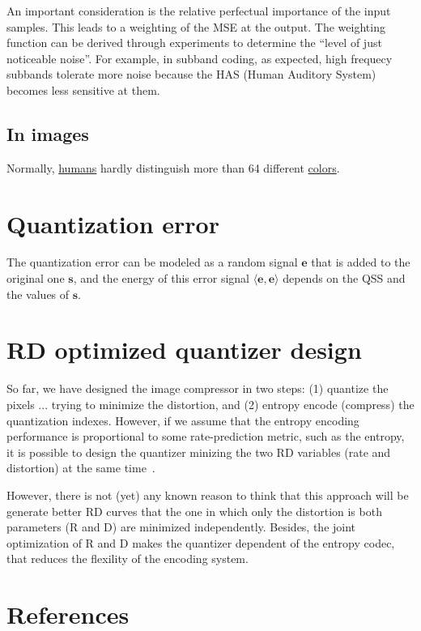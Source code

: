 An important consideration is the relative perfectual importance of
the input samples. This leads to a weighting of the MSE at the
output. The weighting function can be derived through experiments to
determine the ``level of just noticeable noise''. For example, in
subband coding, as expected, high frequecy subbands tolerate more
noise because the HAS (Human Auditory System) becomes less sensitive
at them.

\subsection{In images}

Normally, \href{https://en.wikipedia.org/wiki/Visual_system}{humans}
hardly distinguish more than 64 different
\href{https://en.wikipedia.org/wiki/Color}{colors}.


\section{Quantization error}
The quantization error can be modeled as a random signal $\mathbf{e}$
that is added to the original one $\mathbf{s}$, and the energy of this
error signal $\langle \mathbf{e},\mathbf{e}\rangle$ depends on
the QSS and the values of $\mathbf{s}$.

\section{RD optimized quantizer design}
So far, we have designed the image compressor in two steps: (1)
quantize the pixels ... trying to minimize the distortion, and (2) entropy
encode (compress) the quantization indexes. However, if we assume that
the entropy encoding performance is proportional to some
rate-prediction metric, such as the entropy, it is possible to design
the quantizer minizing the two RD variables (rate and distortion) at
the same time~\cite{sayood2017introduction}.

However, there is not (yet) any known reason to think that this
approach will be generate better RD curves that the one in which only
the distortion is both parameters (R and D) are minimized
independently. Besides, the joint optimization of R and D makes the
quantizer dependent of the entropy codec, that reduces the flexility
of the encoding system.

\section{References}


